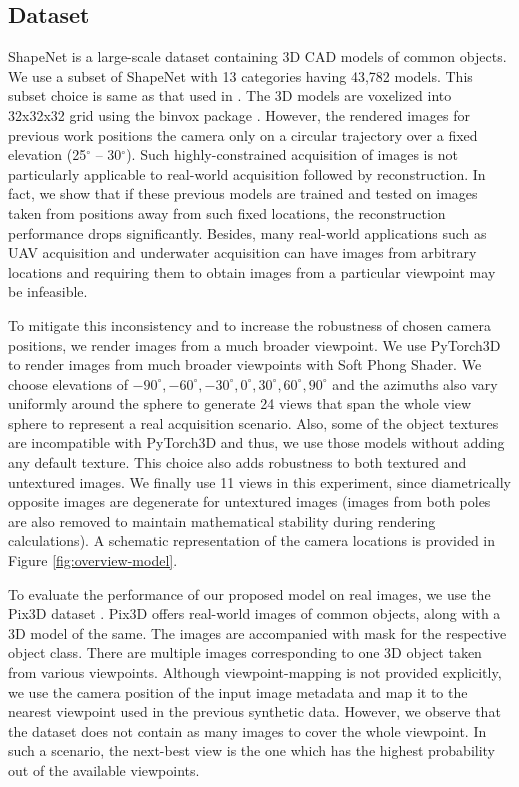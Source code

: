 \subsection{Dataset}
\label{sec:dataset}
ShapeNet \cite{shapenet} is a large-scale dataset containing 3D CAD models of common objects. We use a subset of ShapeNet with 13 categories having 43,782 models. This subset choice is same as that used in \cite{3dr2n2, pix2vox, yang2018active}. The 3D models are voxelized into 32x32x32 grid using the binvox package \cite{binvox, nooruddin03}. However, the rendered images for previous work \cite{pix2vox, 3dr2n2, yang2018active} positions the camera only on a circular trajectory over a fixed elevation (25$^\circ$ -- 30$^\circ$). Such highly-constrained acquisition of images is not particularly applicable to real-world acquisition followed by reconstruction. In fact, we show that if these previous models are trained and tested on images taken from positions away from such fixed locations, the reconstruction performance drops significantly. Besides, many real-world applications such as UAV acquisition and underwater acquisition can have images from arbitrary locations and requiring them to obtain images from a particular viewpoint may be infeasible.

To mitigate this inconsistency and to increase the robustness of chosen camera positions, we render images from a much broader viewpoint. We use PyTorch3D \cite{pytorch3d} to render images from much broader viewpoints with Soft Phong Shader. We choose elevations of $-90^{\circ}, -60^{\circ}, -30^{\circ}, 0^{\circ}, 30^{\circ}, 60^{\circ}, 90^{\circ}$ and the azimuths also vary uniformly around the sphere to generate 24 views that span the whole view sphere to represent a real acquisition scenario. Also, some of the object textures are incompatible with PyTorch3D and thus, we use those models without adding any default texture. This choice also adds robustness to both textured and untextured images. We finally use 11 views in this experiment, since diametrically opposite images are degenerate for untextured images (images from both poles are also removed to maintain mathematical stability during rendering calculations). A schematic representation of the camera locations is provided in Figure \ref{fig:overview-model}.

To evaluate the performance of our proposed model on real images, we use the Pix3D dataset \cite{pix3d}. Pix3D offers real-world images of common objects, along with a 3D model of the same. The images are accompanied with mask for the respective object class. There are multiple images corresponding to one 3D object taken from various viewpoints. Although viewpoint-mapping is not provided explicitly, we use the camera position of the input image metadata and map it to the nearest viewpoint used in the previous synthetic data. However, we observe that the dataset does not contain as many images to cover the whole viewpoint. In such a scenario, the next-best view is the one which has the highest probability out of the available viewpoints.


